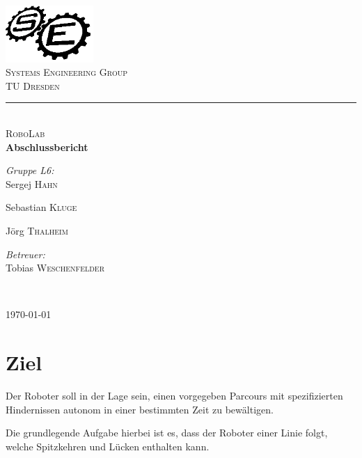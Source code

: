 \documentclass[a4paper]{article}
\newcommand{\HRule}{\rule{\linewidth}{0.25mm}}
\begin{document}
\begin{titlepage}
  \begin{center}
    \includegraphics[width=0.25\textwidth]{myselogo}\\[1cm]
    \textsc{\LARGE Systems Engineering Group\\[0.25cm]{\large TU Dresden}}\\[0.25cm]
    \HRule\\[2cm]


    \textsc{\Large RoboLab}\\[1cm]
    {\huge \bfseries Abschlussbericht}\\[2cm]

    \begin{minipage}{0.4\textwidth}
      \begin{flushleft}
        \large
        \emph{Gruppe L6:}\\
        Sergej \textsc{Hahn}

        Sebastian \textsc{Kluge}

        Jörg \textsc{Thalheim}
      \end{flushleft}
    \end{minipage}
    \begin{minipage}{0.4\textwidth}
      \begin{flushright}
        \large
        \emph{Betreuer:}\\
        Tobias \textsc{Weschenfelder}
      \end{flushright}
    \end{minipage}\\[1cm]

    \vfill

    {\large \today}

  \end{center}
\end{titlepage}

\section{Ziel}
Der Roboter soll in der Lage sein, einen vorgegeben Parcours mit
spezifizierten Hindernissen autonom in einer bestimmten Zeit zu
bewältigen.

Die grundlegende Aufgabe hierbei ist es, dass der Roboter einer Linie
folgt, welche Spitzkehren und Lücken enthalten kann.
\end{document}
